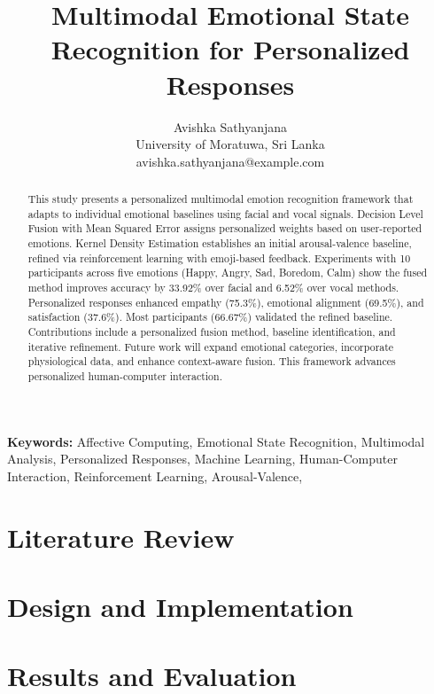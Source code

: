 \documentclass[10pt,a4paper]{article}
\title{\textbf{\fontsize{14}{16}\selectfont Multimodal Emotional State Recognition for Personalized Responses}}
\author{
    \fontsize{10}{12}\selectfont Avishka Sathyanjana \\
    \fontsize{9}{11}\selectfont University of Moratuwa, Sri Lanka \\
    \fontsize{9}{11}\selectfont avishka.sathyanjana@example.com
}
\begin{document}
\maketitle

\begin{abstract}
    \fontsize{9}{11}\selectfont
  This study presents a personalized multimodal emotion recognition framework that adapts to individual emotional baselines using facial and vocal signals. Decision Level Fusion with Mean Squared Error assigns personalized weights based on user-reported emotions. Kernel Density Estimation establishes an initial arousal-valence baseline, refined via reinforcement learning with emoji-based feedback. Experiments with 10 participants across five emotions (Happy, Angry, Sad, Boredom, Calm) show the fused method improves accuracy by 33.92\% over facial and 6.52\% over vocal methods. Personalized responses enhanced empathy (75.3\%), emotional alignment (69.5\%), and satisfaction (37.6\%). Most participants (66.67\%) validated the refined baseline. Contributions include a personalized fusion method, baseline identification, and iterative refinement. Future work will expand emotional categories, incorporate physiological data, and enhance context-aware fusion. This framework advances personalized human-computer interaction.
\end{abstract}

\textbf{Keywords:} Affective Computing, Emotional State Recognition, Multimodal Analysis, Personalized Responses, Machine Learning, Human-Computer Interaction, Reinforcement Learning, Arousal-Valence, 



\section{Literature Review}


\section{Design and Implementation}


\section{Results and Evaluation}

\end{document}
